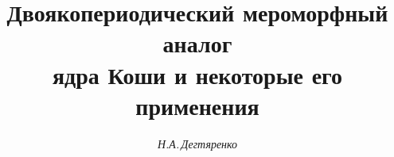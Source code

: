 

 




 


\newcommand{\ord}{\operatorname{ord}} 


\newcommand{\Mod}{\operatorname{mod}} 


\newcommand{\im}{\operatorname{Im}} 


\renewcommand{\baselinestretch}{1.05}


\newcommand{\tts}[1]{} 


 




  


\setcounter{page}{11} 












 


\author{\it Н.А.\,Дегтяренко} 




\title{Двоякопериодический мероморфный аналог\\ 


ядра Коши и некоторые его применения} 


 


\date{} 




\pagestyle{plain} %


 


